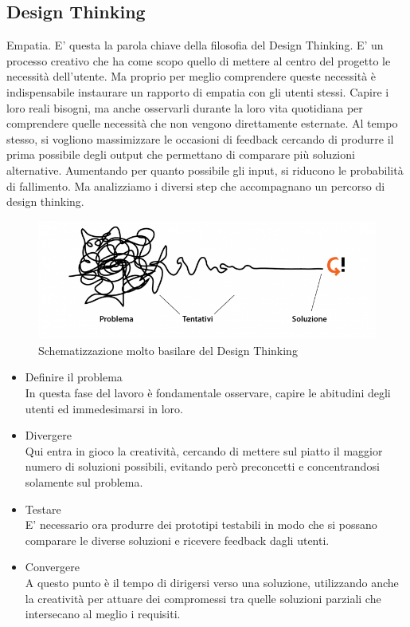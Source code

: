 \subsection{Design Thinking}
Empatia. E' questa la parola chiave della filosofia del Design Thinking. E' un processo creativo che ha come scopo quello di mettere al centro del progetto le necessità dell'utente. Ma proprio per meglio comprendere queste necessità è indispensabile instaurare un rapporto di empatia con gli utenti stessi. Capire i loro reali bisogni, ma anche osservarli durante la loro vita quotidiana per comprendere quelle necessità che non vengono direttamente esternate. Al tempo stesso, si vogliono massimizzare le occasioni di feedback cercando di produrre il prima possibile degli output che permettano di comparare più soluzioni alternative. Aumentando per quanto possibile gli input, si riducono le probabilità di fallimento. Ma analizziamo i diversi step che accompagnano un percorso di design thinking.
\begin{figure}[h!]
	\centering
	\includegraphics[width=\textwidth,keepaspectratio=true]{capitoli/imgs/Design-Thinking.png}
	\caption{Schematizzazione molto basilare del Design Thinking}
\end{figure}
\begin{itemize}
	\item Definire il problema \\
	In questa fase del lavoro è fondamentale osservare, capire le abitudini degli utenti ed immedesimarsi in loro.
	\item Divergere \\
	Qui entra in gioco la creatività, cercando di mettere sul piatto il maggior numero di soluzioni possibili, evitando però preconcetti e concentrandosi solamente sul problema.
	\item Testare \\
	E' necessario ora produrre dei prototipi testabili in modo che si possano comparare le diverse soluzioni e ricevere feedback dagli utenti.
	\item Convergere \\
	A questo punto è il tempo di dirigersi verso una soluzione, utilizzando anche la creatività per attuare dei compromessi tra quelle soluzioni parziali che intersecano al meglio i requisiti.
\end{itemize}


